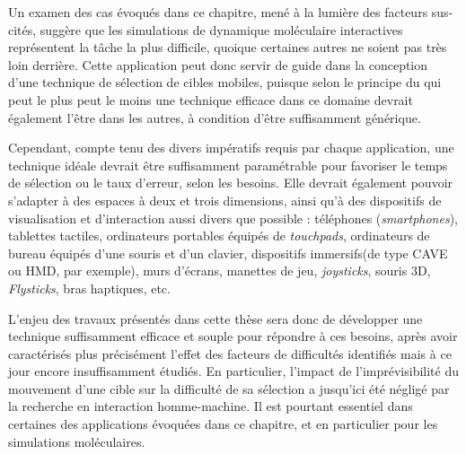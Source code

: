	Un examen des cas évoqués dans ce chapitre, mené à la lumière des facteurs sus-cités, suggère que les simulations de dynamique moléculaire interactives représentent la tâche la plus difficile, quoique certaines autres ne soient pas très loin derrière. Cette application peut donc servir de guide dans la conception d'une technique de sélection de cibles mobiles, puisque selon le principe du \og qui peut le plus peut le moins \fg{} une technique efficace dans ce domaine devrait également l'être dans les autres, à condition d'être suffisamment générique.
	
	Cependant, compte tenu des divers impératifs requis par chaque application, une technique idéale devrait être suffisamment paramétrable pour favoriser le temps de sélection ou le taux d'erreur, selon les besoins. Elle devrait également pouvoir s'adapter à des espaces à deux et trois dimensions, ainsi qu'à des dispositifs de visualisation et d'interaction aussi divers que possible : téléphones (\emph{smartphones}), tablettes tactiles, ordinateurs portables équipés de \emph{touchpads}, ordinateurs de bureau équipés d'une souris et d'un clavier, dispositifs immersifs(de type CAVE ou HMD, par exemple), murs d'écrans, manettes de jeu, \emph{joysticks}, souris 3D, \emph{Flysticks}\footnotemark, bras haptiques, etc.
	
	
	L'enjeu des travaux présentés dans cette thèse sera donc de développer une technique suffisamment efficace et souple pour répondre à ces besoins, après avoir caractérisés plus précisément l'effet des facteurs de difficultés identifiés mais à ce jour encore insuffisamment étudiés. En particulier, l'impact de l'imprévisibilité du mouvement d'une cible sur la difficulté de sa sélection a jusqu'ici été négligé par la recherche en interaction homme-machine. Il est pourtant essentiel dans certaines des applications évoquées dans ce chapitre, et en particulier pour les simulations moléculaires.

\clearpage
